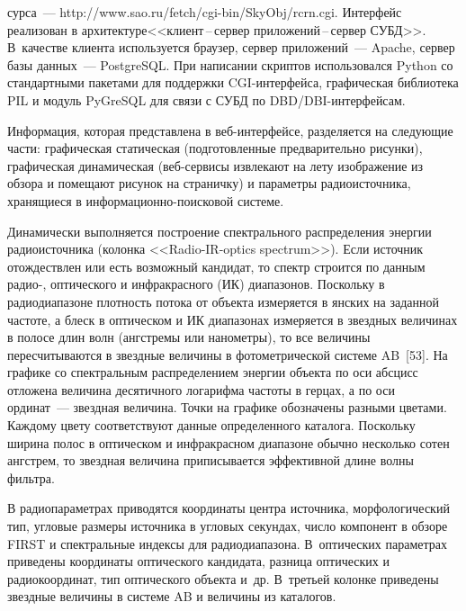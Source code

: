 \begin{multicols}{2}

\noindent
сурса~--- {\sf http://www.sao.ru/fetch/cgi-bin/SkyObj/\linebreak rcrn.cgi}. Интерфейс реализован 
в архитектуре\linebreak <<клиент\,--\,сервер приложений\,--\,сервер СУБД>>. В~качестве клиента 
используется браузер, сервер приложений~--- \mbox{Apache}, сервер базы данных~--- 
\mbox{PostgreSQL}. При написании скриптов использовался Python со стандартными пакетами 
для поддерж\-ки CGI-интер\-фей\-са, графическая биб\-лио\-те\-ка PIL и модуль \mbox{PyGreSQL}
для связи с СУБД по DBD/DBI-интер\-фейсам.








      Информация, которая представлена в веб-ин\-тер\-фей\-се, разделяется на следующие 
части: графическая статическая (подготовленные предварительно рисунки), графическая 
динамическая\linebreak
 (веб-сер\-ви\-сы извлекают на лету изображение из обзора и помещают рисунок 
на страничку) и параметры радиоисточника, хранящиеся в 
      ин\-фор\-ма\-ци\-он\-но-по\-иско\-вой сис\-теме. 
      
      Динамически выполняется построение спектрального распределения энергии 
радиоисточника (колонка <<Radio-IR-optics spectrum>>). Если источник 
отождествлен или есть возможный кандидат, то спектр строится по данным радио-, 
оптического и инфракрасного (ИК) диапазонов. Поскольку в радиодиапазоне плотность потока от 
объекта измеряется в янских на заданной частоте, а блеск в оптическом и ИК диа\-па\-зо\-нах 
измеряется в звездных величинах в полосе длин волн (ангстремы или нанометры), то все 
величины пересчитываются в звездные величины в фотометрической системе AB~[53]. На 
графике со спектральным распределением энергии объекта по оси абсцисс отложена 
величина десятичного логарифма частоты в герцах, а по оси ординат~--- звездная величина. 
Точки на графике обозначены разными цветами. Каждому цвету соответствуют данные 
определенного каталога. Поскольку ширина полос в оптическом и инфракрасном диапазоне 
обычно несколько сотен ангстрем, то звездная величина приписывается эффективной длине 
волны фильтра. 
      
      В радиопараметрах приводятся координаты центра источника, морфологический тип, 
угловые размеры источника в угловых секундах, число компонент в обзоре FIRST и 
спектральные индексы для радиодиапазона. В~оптических параметрах приведены 
координаты оптического кандидата, разница оптических и радиокоординат, тип оптического 
объекта и~др. В~третьей колонке приведены звездные величины в сис\-те\-ме AB и величины 
из каталогов. 
      

\end{multicols}
